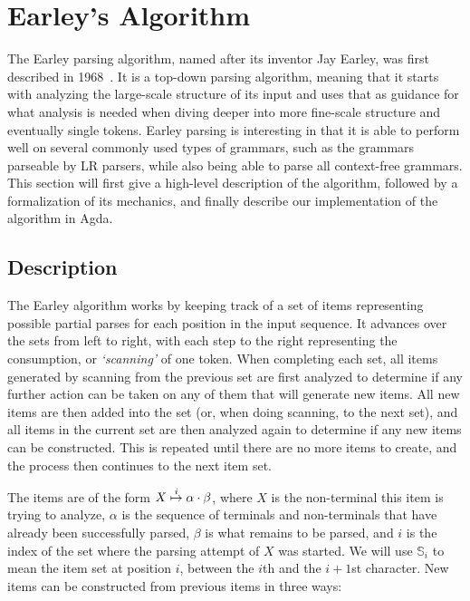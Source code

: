 \chapter{Earley's Algorithm} \label{Earleys}

	The Earley parsing algorithm, named after its inventor Jay Earley, was
	first described in 1968~\cite{Earley}. It is a top-down parsing algorithm,
	meaning that it starts with analyzing the large-scale structure of its
	input and uses that as guidance for what analysis is needed when diving
	deeper into more fine-scale structure and eventually single tokens.  Earley
	parsing is interesting in that it is able to perform well on several
	commonly used types of grammars, such as the grammars parseable by LR
	parsers, while also being able to parse all context-free grammars. This
	section will first give a high-level description of the algorithm, followed
	by a formalization of its mechanics, and finally describe our
	implementation of the algorithm in Agda.

	\section{Description}

		The Earley algorithm works by keeping track of a set of items
		representing possible partial parses for each position in the input
		sequence. It advances over the sets from left to right, with each step
		to the right representing the consumption, or \emph{`scanning'} of one
		token. When completing each set, all items generated by scanning from
		the previous set are first analyzed to determine if any further action
		can be taken on any of them that will generate new items. All new items
		are then added into the set (or, when doing scanning, to the next set),
		and all items in the current set are then analyzed again to determine
		if any new items can be constructed. This is repeated until there are
		no more items to create, and the process then continues to the next
		item set.

		The items are of the form $X\overset{i}{\mapsto}\alpha\cdot\beta$, where $X$ is
		the non-terminal this item is trying to analyze, $\alpha$ is the
		sequence of terminals and non-terminals that have already been
		successfully parsed, $\beta$ is what remains to be parsed, and $i$ is
		the index of the set where the parsing attempt of $X$ was started. We
		will use $\mathbb{S}_i$ to mean the item set at position $i$, between
		the $i$th and the $i+1$st character. New items can be constructed from
		previous items in three ways:

